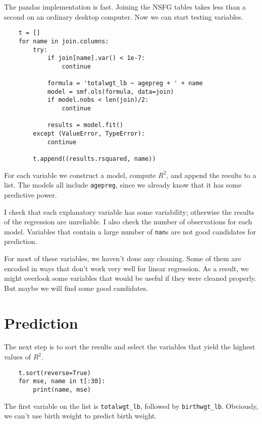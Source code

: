 \documentclass[12pt]{book}
\begin{document}
The pandas implementation is fast.  Joining the NSFG tables takes
less than a second on an ordinary desktop computer.
Now we can start testing variables.

\begin{verbatim}
    t = []
    for name in join.columns:
        try:
            if join[name].var() < 1e-7:
                continue

            formula = 'totalwgt_lb ~ agepreg + ' + name
            model = smf.ols(formula, data=join)
            if model.nobs < len(join)/2:
                continue

            results = model.fit()
        except (ValueError, TypeError):
            continue

        t.append((results.rsquared, name))
\end{verbatim}

For each variable we construct a model, compute $R^2$, and append
the results to a list.  The models all include {\tt agepreg}, since
we already know that it has some predictive power.

I check that each explanatory variable has some variability; otherwise
the results of the regression are unreliable.  I also check the number
of observations for each model.  Variables that contain a large number
of {\tt nan}s are not good candidates for prediction.

For most of these variables, we haven't done any cleaning.  Some of them
are encoded in ways that don't work very well for linear regression.
As a result, we might overlook some variables that would be useful if
they were cleaned properly.  But maybe we will find some good candidates.


\section{Prediction}

The next step is to sort the results and select the variables that
yield the highest values of $R^2$.

\begin{verbatim}
    t.sort(reverse=True)
    for mse, name in t[:30]:
        print(name, mse)
\end{verbatim}

The first variable on the list is \verb"totalwgt_lb",
followed by \verb"birthwgt_lb".  Obviously, we can't use birth
weight to predict birth weight.
\end{document}
